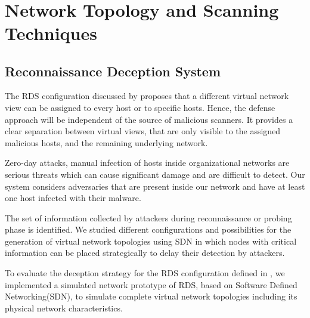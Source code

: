 \clearpage
\thispagestyle{empty}
~\clearpage
\chapter{Network Topology and Scanning Techniques}
\label{chap4}
\section{Reconnaissance Deception System}
The RDS configuration discussed by \cite{7971943} proposes that a different virtual network view can be assigned to every host or to specific hosts. Hence, the defense approach will be independent of the source of malicious scanners. It provides a clear separation between virtual views, that are only visible to the assigned malicious hosts, and the remaining underlying network.

Zero-day attacks, manual infection of hosts inside organizational networks are serious threats which can cause significant damage and are difficult to detect. Our system considers adversaries that are present inside our network and have at least one host infected with their malware.

The set of information collected by attackers during reconnaissance or probing phase is identified. We studied different configurations and possibilities for the generation of virtual network topologies using SDN in which nodes with critical information can be placed strategically to delay their detection by attackers.

To evaluate the deception strategy for the RDS configuration defined in \cite{7971943}, we implemented a simulated network prototype of RDS, based on Software Defined Networking(SDN), to simulate complete virtual network topologies including its physical network characteristics.

